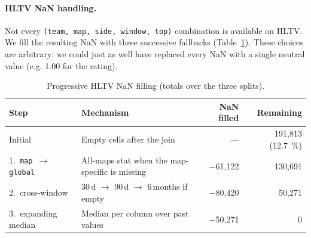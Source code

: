 \paragraph{HLTV NaN handling.}
Not every \texttt{(team, map, side, window, top)} combination is
available on HLTV. We fill the resulting NaN with three successive
fallbacks (Table~\ref{tab:nan_fill}). These choices are arbitrary:
we could just as well have replaced every NaN with a single neutral
value (e.g. 1.00 for the rating).

\begin{table}[H]
\centering
\small
\begin{tabular}{@{}p{3.2cm}p{6.5cm}rr@{}}
\toprule
\textbf{Step} & \textbf{Mechanism} & \textbf{NaN filled} & \textbf{Remaining} \\
\midrule
Initial               & Empty cells after the join                       & ---       & 191{,}813 (12.7~\%) \\
1.~\texttt{map $\to$ global} & All-maps stat when the map-specific is missing & $-$61{,}122 & 130{,}691 \\
2.~cross-window       & 30\,d $\to$ 90\,d $\to$ 6\,months if empty       & $-$80{,}420  & 50{,}271 \\
3.~expanding median   & Median per column over past values               & $-$50{,}271  & 0 \\
\bottomrule
\end{tabular}
\caption{Progressive HLTV NaN filling (totals over the three splits).}
\label{tab:nan_fill}
\end{table}

